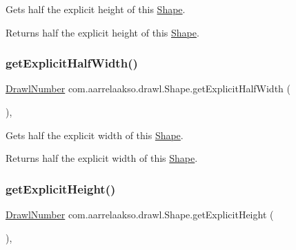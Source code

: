 Gets half the explicit height of this \hyperlink{classcom_1_1aarrelaakso_1_1drawl_1_1_shape}{Shape}. 

\begin{DoxyReturn}{Returns}
half the explicit height of this \hyperlink{classcom_1_1aarrelaakso_1_1drawl_1_1_shape}{Shape}. 
\end{DoxyReturn}
\mbox{\label{classcom_1_1aarrelaakso_1_1drawl_1_1_shape_af952f32cb1706da71c9cb75916f4d665}} 
\subsubsection{\texorpdfstring{get\+Explicit\+Half\+Width()}{getExplicitHalfWidth()}}
{\footnotesize\ttfamily \hyperlink{classcom_1_1aarrelaakso_1_1drawl_1_1_drawl_number}{Drawl\+Number} com.\+aarrelaakso.\+drawl.\+Shape.\+get\+Explicit\+Half\+Width (\begin{DoxyParamCaption}{ }\end{DoxyParamCaption})\hspace{0.3cm}{\ttfamily [protected]}, {\ttfamily [inherited]}}



Gets half the explicit width of this \hyperlink{classcom_1_1aarrelaakso_1_1drawl_1_1_shape}{Shape}. 

\begin{DoxyReturn}{Returns}
half the explicit width of this \hyperlink{classcom_1_1aarrelaakso_1_1drawl_1_1_shape}{Shape}. 
\end{DoxyReturn}
\mbox{\label{classcom_1_1aarrelaakso_1_1drawl_1_1_shape_a76cd6b4d9f427f1888fc98fd653ee496}} 
\subsubsection{\texorpdfstring{get\+Explicit\+Height()}{getExplicitHeight()}}
{\footnotesize\ttfamily \hyperlink{classcom_1_1aarrelaakso_1_1drawl_1_1_drawl_number}{Drawl\+Number} com.\+aarrelaakso.\+drawl.\+Shape.\+get\+Explicit\+Height (\begin{DoxyParamCaption}{ }\end{DoxyParamCaption})\hspace{0.3cm}{\ttfamily [protected]}, {\ttfamily [inherited]}}



